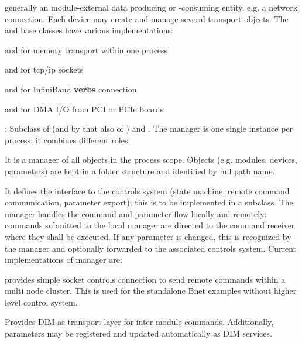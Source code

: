 \begin{description}
   generally an module-external data producing or -consuming entity, e.g. a 
   network connection. 
   Each device may create and manage several transport objects. 
   The  and  base classes have various implementations:
\begin{compactitem}[$\bullet$]
\item {} and  for memory transport within one process
\item {} and  for tcp/ip sockets
\item {} and  for InfiniBand {\bf verbs} connection
\item {} and  for DMA I/O from PCI or PCIe boards  
\end{compactitem}
\item[\class{dabc::Manager}] :  
Subclass of  (and by that also of ) 
   and . The manager is one single instance per process; 
   it combines different roles: 
\begin{compactenum}
      \item It is a manager of all  objects in the process scope. 
      Objects (e.g. modules, devices, parameters) are kept 
      in a folder structure and identified by full path name. 
      \item It defines the interface to the controls system (state machine, 
      remote command communication, parameter export); this is to be implemented 
      in a subclass. The manager handles the command and parameter flow 
      locally and remotely: commands submitted to the local manager are 
      directed to the command receiver where they shall be executed. 
      If any parameter is changed, this is recognized by the manager 
      and optionally forwarded to the associated controls system. Current 
      implementations of manager are:
\begin{compactitem}[$\bullet$]
   \item {} provides simple socket controls connection to 
	 send remote commands within a multi node cluster. This is used for the 
	 standalone Bnet examples without higher level control system.
   \item {} Provides DIM \cite{DIM} as 
	 transport layer for inter-module commands. Additionally, 
	 parameters may be registered and updated automatically as 
	 DIM services. 
	 

\end{compactitem}
\end{compactenum}
\end{description}
